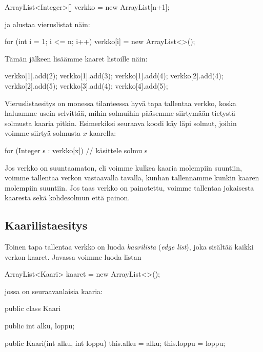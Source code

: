 \begin{code}
ArrayList<Integer>[] verkko = new ArrayList[n+1];
\end{code}

ja alustaa vieruslistat näin:

\begin{code}
for (int i = 1; i <= n; i++) {
    verkko[i] = new ArrayList<>();
}
\end{code}

Tämän jälkeen lisäämme kaaret listoille näin:

\begin{code}
verkko[1].add(2);
verkko[1].add(3);
verkko[1].add(4);
verkko[2].add(4);
verkko[2].add(5);
verkko[3].add(4);
verkko[4].add(5);
\end{code}

Vieruslistaesitys on monessa tilanteessa hyvä tapa tallentaa verkko,
koska haluamme usein selvittää,
mihin solmuihin pääsemme siirtymään tietystä solmusta kaaria pitkin.
Esimerkiksi seuraava koodi käy läpi solmut,
joihin voimme siirtyä solmusta $x$ kaarella:

\begin{code}
for (Integer s : verkko[x]) {
    // käsittele solmu s
}
\end{code}

Jos verkko on suuntaamaton, eli voimme kulkea kaaria molempiin suuntiin,
voimme tallentaa verkon vastaavalla tavalla,
kunhan tallennamme kunkin kaaren molempiin suuntiin.
Jos taas verkko on painotettu, voimme tallentaa jokaisesta
kaaresta sekä kohdesolmun että painon.

\subsection{Kaarilistaesitys}


Toinen tapa tallentaa verkko on luoda \emph{kaarilista}
(\emph{edge list}),
joka sisältää kaikki verkon kaaret.
Javassa voimme luoda listan

\begin{code}
ArrayList<Kaari> kaaret = new ArrayList<>();
\end{code}

jossa on seuraavanlaisia kaaria:

\begin{code}
public class Kaari {
    public int alku, loppu;

    public Kaari(int alku, int loppu) {
        this.alku = alku;
        this.loppu = loppu;
    }
}
\end{code}

